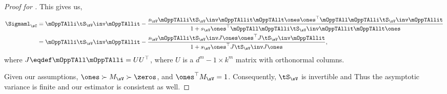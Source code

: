 \begin{proof}[Proof for ]
This gives us,
\begin{align}
    \Sigmaml_{\sC} 
    &= \mOppTAlli \tS_\sV\inv \mOppTAllit 
      - \frac{s_\sV \mOppTAlli \tS_\sV\inv \mOppTAllit \mOppTAllt \ones \ones^\top \mOppTAll \mOppTAlli \tS_\sV\inv \mOppTAllit }
      {1 + s_\sV \ones^\top \mOppTAll \mOppTAlli \tS_\sV\inv \mOppTAllit \mOppTAllt \ones} \nonumber \\
    &= \mOppTAlli \tS_\sV\inv \mOppTAllit 
      - \frac{s_\sV \mOppTAlli \tS_\sV\inv J \ones \ones^\top J \tS_\sV\inv \mOppTAllit }
      {1 + s_\sV \ones^\top J \tS_\sV\inv J \ones}, \label{eqn:asymp-var-ml}
\end{align}
where $J \eqdef \mOppTAll \mOppTAlli = U U^\top$, where $U$ is a $d^m
- 1 \times k^m$ matrix with orthonormal columns.

Given our assumptions, $\ones \succ M_\sV \succ \zeros$, and
  $\ones^\top M_\sV = 1$. Consequently, $\tS_\sV$ is invertible and 
Thus the asymptotic variance is finite and our estimator is consistent
  as well. 
\end{proof}

